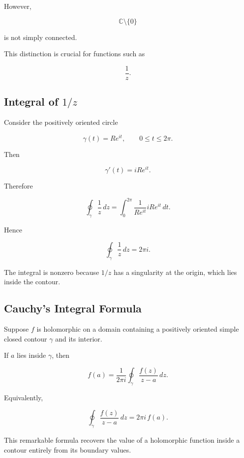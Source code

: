 However,

\[
\mathbb{C}\setminus\{0\}
\]

is not simply connected.

This distinction is crucial for functions such as

\[
\frac1z.
\]

\subsection{Integral of \(1/z\)}
\label{subsec:integral-one-over-z}

Consider the positively oriented circle

\[
\gamma(t)=Re^{it},
\qquad
0\leq t\leq2\pi.
\]

Then

\[
\gamma'(t)=iRe^{it}.
\]

Therefore

\[
\oint_\gamma\frac1z\,dz
=
\int_0^{2\pi}
\frac{1}{Re^{it}}
iRe^{it}\,dt.
\]

Hence

\[
\boxed{
\oint_\gamma\frac1z\,dz
=
2\pi i.
}
\]

The integral is nonzero because \(1/z\) has a singularity at the origin,
which lies inside the contour.

\subsection{Cauchy's Integral Formula}
\label{subsec:cauchy-integral-formula}

\begin{theorem}
Suppose \(f\) is holomorphic on a domain containing a positively oriented
simple closed contour \(\gamma\) and its interior.

If \(a\) lies inside \(\gamma\), then

\[
\boxed{
f(a)
=
\frac{1}{2\pi i}
\oint_\gamma
\frac{f(z)}{z-a}\,dz.
}
\]
\end{theorem}

Equivalently,

\[
\boxed{
\oint_\gamma
\frac{f(z)}{z-a}\,dz
=
2\pi i\,f(a).
}
\]

This remarkable formula recovers the value of a holomorphic function
inside a contour entirely from its boundary values.

